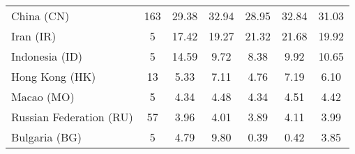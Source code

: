 \begin{table}[h!]
{\begin{tabular}{lcccccc}
    China (CN) & \color{black} 163 & {\cellcolor[HTML]{EDF4FC}} \color[HTML]{000000} \color{black} 29.38 & {\cellcolor[HTML]{6CAED6}} \color[HTML]{F1F1F1} \color{black} 32.94 & {\cellcolor[HTML]{F7FBFF}} \color[HTML]{000000} \color{black} 28.95 & {\cellcolor[HTML]{71B1D7}} \color[HTML]{F1F1F1} \color{black} 32.84 & \color{black} 31.03 \\
Iran (IR) & \color{black} 5 & {\cellcolor[HTML]{F7FBFF}} \color[HTML]{000000} \color{black} 17.42 & {\cellcolor[HTML]{CDDFF1}} \color[HTML]{000000} \color{black} 19.27 & {\cellcolor[HTML]{7CB7DA}} \color[HTML]{000000} \color{black} 21.32 & {\cellcolor[HTML]{6AAED6}} \color[HTML]{F1F1F1} \color{black} 21.68 & \color{black} 19.92 \\
Indonesia (ID) & \color{black} 5 & {\cellcolor[HTML]{6AAED6}} \color[HTML]{F1F1F1} \color{black} 14.59 & {\cellcolor[HTML]{E2EDF8}} \color[HTML]{000000} \color{black} 9.72 & {\cellcolor[HTML]{F7FBFF}} \color[HTML]{000000} \color{black} 8.38 & {\cellcolor[HTML]{DFEBF7}} \color[HTML]{000000} \color{black} 9.92 & \color{black} 10.65 \\
Hong Kong (HK) & \color{black} 13 & {\cellcolor[HTML]{DFECF7}} \color[HTML]{000000} \color{black} 5.33 & {\cellcolor[HTML]{71B1D7}} \color[HTML]{F1F1F1} \color{black} 7.11 & {\cellcolor[HTML]{F7FBFF}} \color[HTML]{000000} \color{black} 4.76 & {\cellcolor[HTML]{6AAED6}} \color[HTML]{F1F1F1} \color{black} 7.19 & \color{black} 6.10 \\
Macao (MO) & \color{black} 5 & {\cellcolor[HTML]{F7FBFF}} \color[HTML]{000000} \color{black} 4.34 & {\cellcolor[HTML]{8DC1DD}} \color[HTML]{000000} \color{black} 4.48 & {\cellcolor[HTML]{F7FBFF}} \color[HTML]{000000} \color{black} 4.34 & {\cellcolor[HTML]{6AAED6}} \color[HTML]{F1F1F1} \color{black} 4.51 & \color{black} 4.42 \\
Russian Federation (RU) & \color{black} 57 & {\cellcolor[HTML]{D8E7F5}} \color[HTML]{000000} \color{black} 3.96 & {\cellcolor[HTML]{BFD8ED}} \color[HTML]{000000} \color{black} 4.01 & {\cellcolor[HTML]{F7FBFF}} \color[HTML]{000000} \color{black} 3.89 & {\cellcolor[HTML]{6CAED6}} \color[HTML]{F1F1F1} \color{black} 4.11 & \color{black} 3.99 \\
Bulgaria (BG) & \color{black} 5 & {\cellcolor[HTML]{CADDF0}} \color[HTML]{000000} \color{black} 4.79 & {\cellcolor[HTML]{6CAED6}} \color[HTML]{F1F1F1} \color{black} 9.80 & {\cellcolor[HTML]{F7FBFF}} \color[HTML]{000000} \color{black} 0.39 & {\cellcolor[HTML]{F7FBFF}} \color[HTML]{000000} \color{black} 0.42 & \color{black} 3.85 \\

\end{tabular}}
\end{table}

